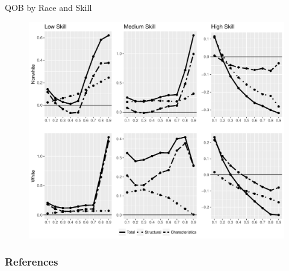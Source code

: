 \documentclass[xcolor={dvipsnames},8pt]{beamer}
\theoremstyle{definition}
\begin{document}
\begin{frame}{QOB by Race and Skill}

\begin{figure}[h]
    \centering
    \includegraphics[scale = 0.45]{003_qob_rs_debug.pdf}
\end{figure}

\end{frame}

%

\begin{frame}[allowframebreaks*] %
\frametitle{References}
\scriptsize{}
\end{frame}
\end{document}
